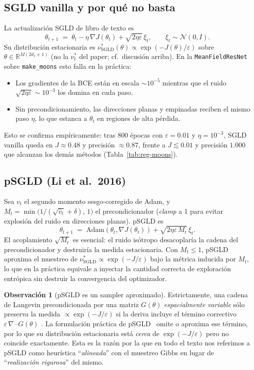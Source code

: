 \documentclass[11pt, a4paper]{article}
\theoremstyle{definition}
\newtheorem{remark}{Observación}[section]
\newcommand{\eps}{\varepsilon}
\begin{document}
\subsection{SGLD vanilla y por qué no basta}
\label{sec:reg-moons-sgld}

La actualización SGLD de libro de texto es
\[
  \theta_{t+1} \;=\; \theta_t - \eta\,\nabla J(\theta_t) +
  \sqrt{2\eta\eps}\,\xi_t,\qquad \xi_t\sim\mathcal{N}(0,I).
\]
Su distribución estacionaria es
$\nu^*_{\mathrm{SGLD}}(\theta)\propto\exp(-J(\theta)/\eps)$ sobre
$\theta\in\mathbb{R}^{M(2d_1+1)}$ (no la $\nu^*_t$ del paper; cf.\
discusión arriba). En la \texttt{MeanFieldResNet} sobre
\texttt{make\_moons} esto falla en la práctica:
\begin{itemize}
  \item Los gradientes de la BCE están en escala $\sim 10^{-5}$
        mientras que el ruido $\sqrt{2\eta\eps}\sim 10^{-3}$ los
        domina en cada paso.
  \item Sin precondicionamiento, las direcciones planas y empinadas
        reciben el mismo paso $\eta$, lo que estanca a
        $\theta_t$ en regiones de alta pérdida.
\end{itemize}
Esto se confirma empíricamente: tras 800 épocas con $\eps=0.01$ y
$\eta=10^{-3}$, SGLD vanilla queda en $J\approx 0.48$ y precisión
$\approx 0.87$, frente a $J\lesssim 0.01$ y precisión $1.000$ que
alcanzan los demás métodos (Tabla~\ref{tab:reg-moons}).

\subsection{pSGLD (Li et al.\ 2016)}
\label{sec:reg-moons-psgld}

Sea $v_t$ el segundo momento sesgo-corregido de Adam, y
$M_t = \min\!\bigl(1/(\sqrt{\hat v_t}+\delta),\,1\bigr)$ el
precondicionador (\emph{clamp} a 1 para evitar explosión del ruido en
direcciones planas). pSGLD es
\[
  \theta_{t+1} \;=\; \mathrm{Adam}(\theta_t,\nabla J(\theta_t)) +
  \sqrt{2\eta\eps\,M_t}\,\xi_t.
\]
El acoplamiento $\sqrt{M_t}$ es esencial: el ruido isótropo
desacoplaría la cadena del precondicionador y destruiría la medida
estacionaria. Con $M_t\le 1$, pSGLD aproxima el muestreo de
$\nu^*_{\mathrm{SGLD}}\propto\exp(-J/\eps)$ bajo la métrica inducida
por $M_t$, lo que en la práctica equivale a inyectar la cantidad
correcta de exploración entrópica sin destruir la convergencia del
optimizador.

\begin{remark}[pSGLD es un sampler aproximado]
\label{rem:psgld-aprox}
Estrictamente, una cadena de Langevin precondicionada por una matriz
$G(\theta)$ \emph{espacialmente variable} sólo preserva la medida
$\propto\exp(-J/\eps)$ si la deriva incluye el término correctivo
$\eps\,\nabla\!\cdot G(\theta)$ \cite{Ma2015,Girolami2011}. La
formulación práctica de pSGLD~\cite{Li2016} omite o aproxima ese
término, por lo que su distribución estacionaria está \emph{cerca}
de $\exp(-J/\eps)$ pero no coincide exactamente. Esta es la razón por
la que en todo el texto nos referimos a pSGLD como heurística
``\emph{alineada}'' con el muestreo Gibbs en lugar de
``\emph{realización rigurosa}'' del mismo.
\end{remark}
\end{document}
